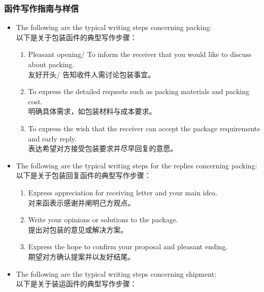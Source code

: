 \documentclass[12pt]{beamer}
\begin{document}
    \begin{frame}[allowframebreaks]
    \frametitle{函件写作指南与样信}
    \begin{itemize}
    \item The following are the typical writing steps concerning packing: \\
    以下是关于包装函件的典型写作步骤：
    
    \begin{enumerate}
    \item Pleasant opening/ To inform the receiver that you would like to discuss about packing. \\
    友好开头/ 告知收件人需讨论包装事宜。
    
    \item To express the detailed requests such as packing materials and packing cost. \\
    明确具体需求，如包装材料与成本要求。
    
    \item To express the wish that the receiver can accept the package requirements and early reply. \\
    表达希望对方接受包装要求并尽早回复的意愿。
    \end{enumerate}
    
    \item The following are the typical writing steps for the replies concerning packing: \\
    以下是关于包装回复函件的典型写作步骤：
    
    \begin{enumerate}
    \item Express appreciation for receiving letter and your main idea. \\
    对来函表示感谢并阐明己方观点。
    
    \item Write your opinions or solutions to the package. \\
    提出对包装的意见或解决方案。
    
    \item Express the hope to confirm your proposal and pleasant ending. \\
    期望对方确认提案并以友好结尾。
    \end{enumerate}
    
    \item The following are the typical writing steps concerning shipment: \\
    以下是关于装运函件的典型写作步骤：
    

\end{itemize}
\end{frame}
\end{document}
